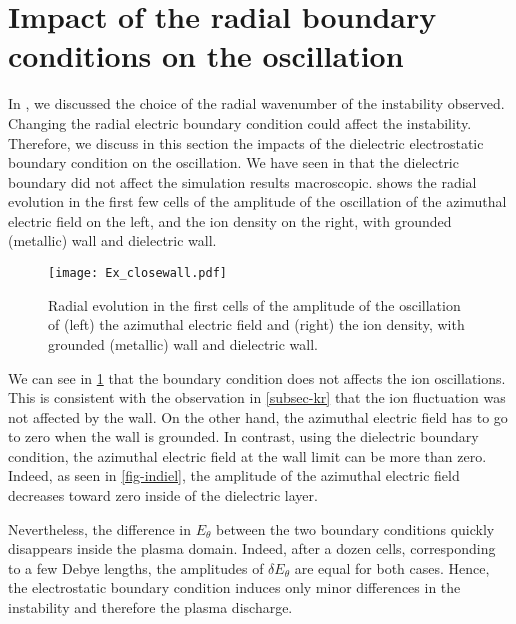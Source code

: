 
\section{Impact of the radial boundary conditions on the oscillation}
  \label{subsec-BC}

  In , we discussed the choice of the radial wavenumber of the instability observed.
  Changing the radial electric boundary condition could affect the instability.
  Therefore, we discuss in this section  the impacts of the dielectric electrostatic boundary condition on the oscillation.
  We have seen in  that the dielectric boundary did not affect the simulation results macroscopic.
   shows the radial evolution in the first few cells of the amplitude of the oscillation of the azimuthal electric field on the left, and the ion density on the right, with grounded (metallic) wall and dielectric wall.
  
  \begin{figure}[!hbt]
    \centering
    \texttt{[image: Ex\_closewall.pdf]}
    \caption{Radial evolution in the first cells of the amplitude of the oscillation of (left) the azimuthal electric field and (right) the ion density, with grounded (metallic) wall and dielectric wall.}
    \label{fig-closswallosci}
  \end{figure}
  
  We can see in \cref{fig-closswallosci} that the boundary condition does not affects the ion oscillations.
  This is consistent with the observation in \cref{subsec-kr} that the ion fluctuation was not affected by the wall.
  On the other hand, the azimuthal electric field has to go to zero when the wall is grounded.
  In contrast, using the dielectric boundary condition, the azimuthal electric field at the wall limit can be more than zero.
  Indeed, as seen in \cref{fig-indiel}, the amplitude of the azimuthal electric field decreases toward zero inside of the dielectric layer.
  
  Nevertheless, the difference in $E_{\theta}$ between the two boundary conditions quickly disappears inside the plasma domain.
  Indeed, after a dozen cells, corresponding to a few Debye lengths, the amplitudes of $\delta E_{\theta}$ are equal for both cases.
  Hence, the electrostatic boundary condition induces only minor differences in the instability and therefore the plasma discharge.
  
  